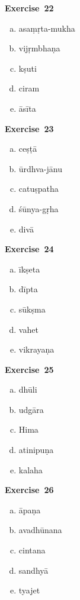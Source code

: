 \begin{multicols}{2}
\noindent\textbf{Exercise~22}
\vspace{-10pt}
\begin{enumerate}[a.]
\itemsep=0pt
\item asaṃṛta-mukha
\item vijṛmbhaṇa 	
\item kṣuti 
\item ciram
\item āsīta
\end{enumerate}

\noindent\textbf{Exercise~23}
\vspace{-10pt}
\begin{enumerate}[a.]
\itemsep=0pt
\item ceṣṭā 
\item ūrdhva-jānu 
\item catuṣpatha 
\item śūnya-gṛha 
\item divā
\end{enumerate}

\noindent\textbf{Exercise~24}
\vspace{-10pt}
\begin{enumerate}[a.]
\itemsep=0pt
\item īkṣeta 
\item dīpta 
\item sūkṣma
\item vahet
\item vikrayaṇa
\end{enumerate}

\noindent\textbf{Exercise~25}
\vspace{-10pt}
\begin{enumerate}[a.]
\itemsep=0pt
\item dhūli 
\item udgāra
\item Hima
\item atinipuṇa
\item kalaha
\end{enumerate}

\noindent\textbf{Exercise~26}
\vspace{-10pt}
\begin{enumerate}[a.]
\itemsep=0pt
\item āpaṇa
\item avadhūnana
\item cintana
\item sandhyā 
\item tyajet
\end{enumerate}


\end{multicols}
